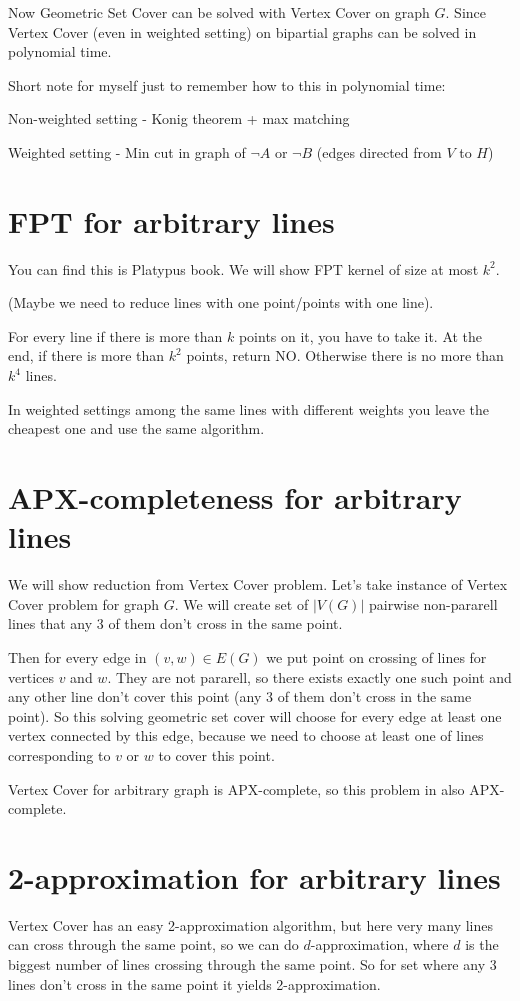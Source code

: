 \documentclass[en]{pracamgr}
\begin{document}
Now Geometric Set Cover can be solved with Vertex Cover on graph $G$.
Since Vertex Cover (even in weighted setting) 
on bipartial graphs can be solved in polynomial time.

Short note for myself just to remember how to this in polynomial time:

Non-weighted setting - Konig theorem + max matching

Weighted setting - Min cut in graph of $\neg A$ or $\neg B$
(edges directed from $V$ to $H$)

\section{FPT for arbitrary lines}
You can find this is Platypus book.
We will show FPT kernel of size at most $k^2$.

(Maybe we need to reduce lines with one point/points with one line).

For every line if there is more than $k$ points on it,
you have to take it. At the end, if there is more than $k^2$ points,
return NO.
Otherwise there is no more than $k^4$ lines.

In weighted settings among the same lines with different weights
you leave the cheapest one and use the same algorithm.

\section{APX-completeness for arbitrary lines}
We will show reduction from Vertex Cover problem.
Let's take instance of Vertex Cover problem for graph $G$.
We will create set of $|V(G)|$ pairwise non-pararell lines
that any 3 of them don't cross in the same point.

Then for every edge in $(v, w) \in E(G)$
we put point on crossing of lines for vertices $v$ and $w$.
They are not pararell, so there exists exactly one such point
and any other line don't cover this point (any 3 of them don't
cross in the same point).
So this solving geometric set cover will choose
for every edge at least one vertex connected by this edge,
because we need to choose at least one of
lines corresponding to $v$ or $w$ to cover this point.

Vertex Cover for arbitrary graph is APX-complete,
so this problem in also APX-complete.

\section{2-approximation for arbitrary lines}
Vertex Cover has an easy 2-approximation algorithm,
but here very many lines can cross through
the same point, so we can do $d$-approximation,
where $d$ is the biggest number of lines crossing through the same point.
So for set where any 3 lines don't cross in the same point
it yields 2-approximation.
\end{document}
